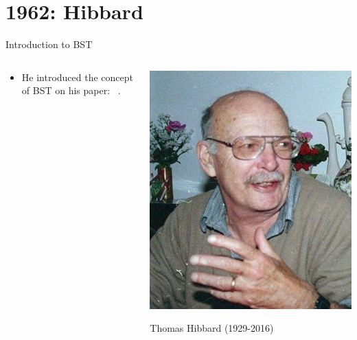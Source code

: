 \documentclass{beamer}
\begin{document}
\section{1962: Hibbard}
\begin{frame}{Introduction to BST}
    
\begin{columns}[c]
    \begin{column}{0.5\textwidth}
     \begin{itemize}
         \item He introduced the concept of BST on his paper: ~.
     \end{itemize}
    \end{column}
    \begin{column}{0.5\textwidth}
        \includegraphics[width=\textwidth]{hibbard.jpg}
        \begin{center}
            Thomas Hibbard (1929-2016)
        \end{center}
    \end{column}
    
\end{columns}
\end{frame}
\end{document}
